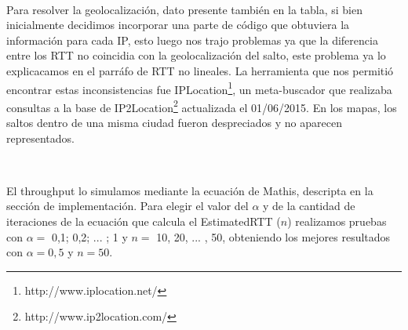 ~

Para resolver la geolocalización, dato presente también en la tabla, si bien inicialmente decidimos incorporar una parte de código que obtuviera la información para cada IP, esto luego nos trajo problemas ya que la diferencia entre los RTT no coincidia con la geolocalización del salto, este problema ya lo explicacamos en el parráfo de RTT no lineales. La herramienta que nos permitió encontrar estas inconsistencias fue IPLocation\footnote{http://www.iplocation.net/}, un meta-buscador que realizaba consultas a la base de IP2Location\footnote{http://www.ip2location.com/} actualizada el 01/06/2015. En los mapas, los saltos dentro de una misma ciudad fueron despreciados y no aparecen representados.

~

El throughput lo simulamos mediante la ecuación de Mathis, descripta en la sección de implementación. Para elegir el valor del $\alpha$ y de la cantidad de iteraciones de la ecuación que calcula el EstimatedRTT ($n$) realizamos pruebas con $\alpha =$ 0,1; 0,2; ... ; 1 y $n =$ 10, 20, ... , 50, obteniendo los mejores resultados con $\alpha = 0,5$ y $n = 50$.

